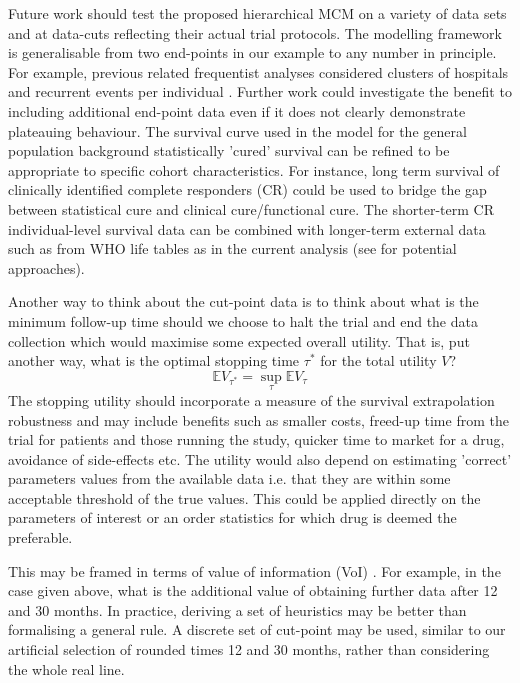 \documentclass[AMA,STIX1COL]{WileyNJD-v2}
\begin{document}
Future work should test the proposed hierarchical MCM on a variety of data sets and at data-cuts reflecting their actual trial protocols.
The modelling framework is generalisable from two end-points in our example to any number in principle.
For example, previous related frequentist analyses considered clusters of hospitals and recurrent events per individual \citep{Lai2008, Lai2009}.
Further work could investigate the benefit to including additional end-point data even if it does not clearly demonstrate plateauing behaviour.
The survival curve used in the model for the general population background statistically 'cured' survival can be refined to be appropriate to specific cohort characteristics. For instance, long term survival of clinically identified complete responders (CR) could be used to bridge the gap between statistical cure and clinical cure/functional cure. The shorter-term CR individual-level survival data can be combined with longer-term external data such as from WHO life tables as in the current analysis (see \citep{Jackson2017} for potential approaches).

Another way to think about the cut-point data is to think about what is the minimum follow-up time should we choose to halt the trial and end the data collection which would maximise some expected overall utility.
That is, put another way, what is the optimal stopping time $\tau^*$ for the total utility $V$?
$$
\mathbb{E} V_{\tau^*} = \sup_{\tau} \mathbb{E} V_{\tau}
$$
The stopping utility should incorporate a measure of the survival extrapolation robustness and may include benefits such as smaller costs, freed-up time from the trial for patients and those running the study, quicker time to market for a drug, avoidance of side-effects etc.
The utility would also depend on estimating 'correct' parameters values from the available data i.e. that they are within some acceptable threshold of the true values.
This could be applied directly on the parameters of interest or an order statistics for which drug is deemed the preferable.

This may be framed in terms of value of information (VoI) \citep{Heath2017}.
For example, in the case given above, what is the additional value of obtaining further data after 12 and 30 months.
In practice, deriving a set of heuristics may be better than formalising a general rule.
A discrete set of cut-point may be used, similar to our artificial selection of rounded times 12 and 30 months, rather than considering the whole real line.
\end{document}

